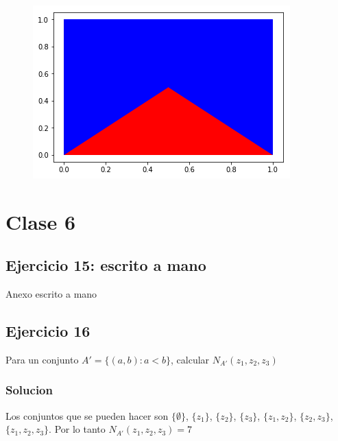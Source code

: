 \documentclass[12pt, a4paper]{article}
\begin{document}
\begin{figure}[H]
\begin{minipage}[b]{.5\linewidth}
		\includegraphics[width = \textwidth]{seccion_x}
		\label{fig:x}
	\end{minipage}
	\label{fig:error}
\end{figure}

\section{Clase 6}
\subsection{Ejercicio 15: escrito a mano}
Anexo escrito a mano
\subsection{Ejercicio 16}
Para un conjunto $A' = \{(a,b): a<b \}$, calcular $N_{A'}(z_1,z_2,z_3)$
\subsubsection{Solucion}
Los conjuntos que se pueden hacer son $\{\emptyset\}$, $\{z_1\}$, $\{z_2\}$, $\{z_3\}$, $\{z_1,z_2\}$, $\{z_2,z_3\}$, $\{z_1, z_2, z_3\}$. Por lo tanto $N_{A'}(z_1,z_2,z_3) = 7$
\end{document}
